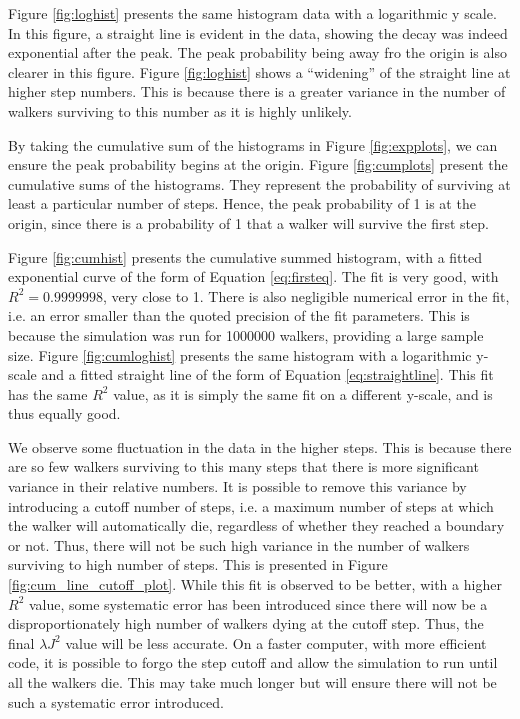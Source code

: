 \documentclass[journal]{IEEEtran}
\begin{document}
Figure \ref{fig:loghist} presents the same histogram data with a logarithmic y
scale. In this figure, a straight line is evident in the data, showing the decay
was indeed exponential after the peak. The peak probability being away fro the
origin is also clearer in this figure. Figure \ref{fig:loghist} shows a
``widening'' of the straight line at higher step numbers. This is because there
is a greater variance in the number of walkers surviving to this number as it is
highly unlikely. 

By taking the cumulative sum of the histograms in Figure \ref{fig:expplots}, we
can ensure the peak probability begins at the origin. Figure \ref{fig:cumplots}
present the cumulative sums of the histograms. They represent the probability of
surviving at least a particular number of steps. Hence, the peak probability of
1 is at the origin, since there is a probability of 1 that a walker will survive
the first step.

Figure \ref{fig:cumhist} presents the cumulative summed histogram, with a fitted
exponential curve of the form of Equation \ref{eq:firsteq}. The fit is very
good, with $R^2 = 0.9999998$, very close to 1. There is also negligible
numerical error in the fit, i.e. an error smaller than the quoted precision of
the fit parameters. This is because the simulation was run for 1000000 walkers,
providing a large sample size. Figure \ref{fig:cumloghist} presents the same
histogram with a logarithmic y-scale and a fitted straight line of the form of
Equation \ref{eq:straightline}. This fit has the same $R^2$ value, as it is
simply the same fit on a different y-scale, and is thus equally good.

We observe some fluctuation in the data in the higher steps. This is because
there are so few walkers surviving to this many steps that there is more
significant variance in their relative numbers. It is possible to remove this
variance by introducing a cutoff number of steps, i.e. a maximum number of steps
at which the walker will automatically die, regardless of whether they reached a
boundary or not. Thus, there will not be such high variance in the number of
walkers surviving to high number of steps. This is presented in Figure
\ref{fig:cum_line_cutoff_plot}. While this fit is observed to be better, with a
higher $R^2$ value, some systematic error has been introduced since there will now
be a disproportionately high number of walkers dying at the cutoff step. Thus,
the final $\lambda J^2$ value will be less accurate. On a faster computer, with
more efficient code, it is possible to forgo the step cutoff and allow the
simulation to run until all the walkers die. This may take much longer but will
ensure there will not be such a systematic error introduced.
\end{document}
